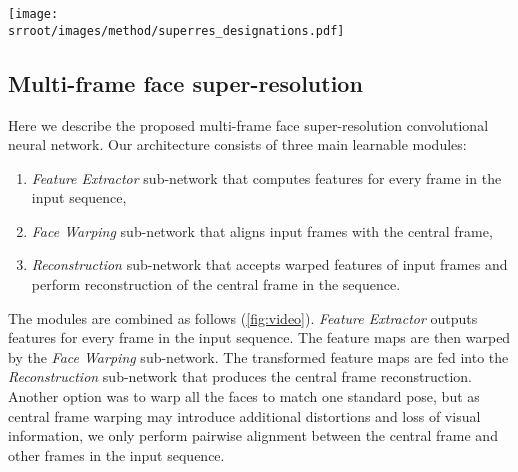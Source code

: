 \begin{figure*}

\texttt{[image: \\srroot/images/method/superres\_designations.pdf]}

\caption{The general scheme of our video-based super-resolution convolutional network. \emph{Feature Extractor} modules (red) compute features for every frame in the input sequence, which are then warped by the \emph{Face Warping} sub-network (blue). The transformed feature maps are fed into the \emph{Reconstruction} sub-network (purple) that produces the central frame reconstruction. Spatial transformer modules \cite{JaderbergSZK15} with thin plate spline transformer are used in the \emph{Face Warping} sub-network.}

\label{fig:video}


\end{figure*}

\subsection{Multi-frame face super-resolution}
\label{sec:video}
Here we describe the proposed multi-frame face super-resolution convolutional neural network. Our architecture consists of three main learnable modules:
\begin{enumerate}
\item\emph{Feature Extractor} sub-network that computes features for every frame in the input sequence, \item\emph{Face Warping} sub-network that aligns input frames with the central frame,  
\item\emph{Reconstruction} sub-network that accepts warped features of input frames and perform reconstruction of the central frame in the sequence.
\end{enumerate}
The modules are combined as follows (\ref{fig:video}). \emph{Feature Extractor} outputs features for every frame in the input sequence. The feature maps are then warped by the \emph{Face Warping} sub-network. The transformed feature maps are fed into the \emph{Reconstruction} sub-network that produces the central frame reconstruction. Another option was to warp all the faces to match one standard pose, but as central frame warping may introduce additional distortions and loss of visual information, we only perform pairwise alignment between the central frame and other frames in the input sequence. 

